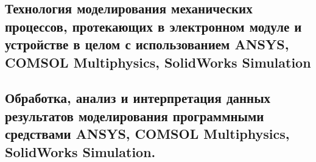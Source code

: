 \subsection{Технология моделирования механических процессов,
протекающих в электронном модуле и устройстве в целом с
использованием ANSYS, COMSOL Multiphysics, SolidWorks Simulation}

\subsection{Обработка, анализ и интерпретация данных результатов
моделирования программными средствами ANSYS, COMSOL Multiphysics,
SolidWorks Simulation.}




\newpage


